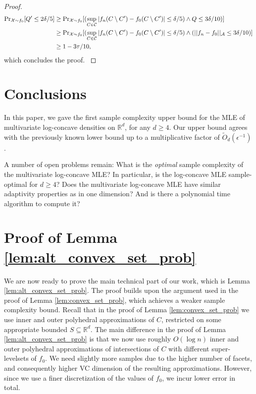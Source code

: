 \documentclass[final,12pt]{colt2018}
\newtheorem{informal theorem}[theorem]{Theorem (informal statement)}
\newcommand{\R}{\mathbb{R}}
\newcommand{\eps}{\epsilon}
\begin{document}
\begin{proof}
{\begin{align}
{\Pr}_{\mathcal{X}\sim f_0}[ Q' \leq 2\delta/5] \notag 
&\geq {\Pr}_{\mathcal{X}\sim f_0}[( \sup_{C \in \mathcal{C}} |f_n(C\setminus C')-f_0(C\setminus C')| \leq \delta/5) \wedge Q \leq 3\delta/10)] \notag\\
&\geq {\Pr}_{\mathcal{X}\sim f_0}[( \sup_{C \in \mathcal{C}} |f_n(C\setminus C')-f_0(C\setminus C')| \leq \delta/5) \wedge ( ||f_n - f_0||_{\mathcal{A}} \leq 3\delta/10)] \notag\\
 &\geq 1-3\tau/10 \notag,
\end{align}
which concludes the proof.
}
\end{proof}

\section{Conclusions} \label{sec:conc}

In this paper, we gave the first sample complexity upper bound for the MLE of
multivariate log-concave densities on $\R^d$, for any $d \geq 4$. 
Our upper bound agrees with the previously known lower bound up to a multiplicative factor of
$\tilde O_d (\eps^{-1})$.

A number of open problems remain:
What is the {\em optimal} sample complexity of the multivariate log-concave MLE?
In particular, is the log-concave MLE sample-optimal for $d \geq 4$?
Does the multivariate log-concave MLE have similar adaptivity properties
as in one dimension? And is there a polynomial time algorithm to compute it?




%




\appendix

\section{Proof of Lemma \ref{lem:alt_convex_set_prob}}\label{sec:full-proof}

We are now ready to prove the main technical part of our work, which is Lemma \ref{lem:alt_convex_set_prob}.
The proof builds upon the argument used in the proof of Lemma \ref{lem:convex_set_prob}, which achieves a weaker sample complexity bound.
Recall that in the proof of Lemma \ref{lem:convex_set_prob} we use inner and outer polyhedral approximations of $C$, restricted on some appropriate bounded $S\subseteq \mathbb{R}^d$.
The main difference in the proof of Lemma \ref{lem:alt_convex_set_prob} is that we now use roughly $O(\log n)$ inner and outer polyhedral approximations of intersections of $C$ with different super-levelsets of $f_0$.
We need slightly more samples due to the higher number of facets, and consequently higher VC dimension of the resulting approximations.
However, since we use a finer discretization of the values of $f_0$, we incur lower error in total.
\end{document}
